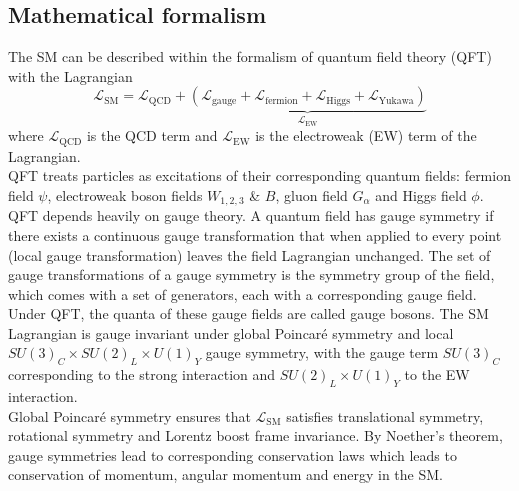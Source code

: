 \documentclass[../thesis.tex]{subfiles}
\begin{document}
\subsection{Mathematical formalism}
The \acs{SM} can be described within the formalism of quantum field theory (\acs{QFT}) with the Lagrangian
\begin{equation}
\mathcal{L}_\mathrm{SM} = \mathcal{L}_\mathrm{QCD} + {\underbrace{(\mathcal{L}_\mathrm{gauge}+\mathcal{L}_\mathrm{fermion}+\mathcal{L}_\mathrm{Higgs}+\mathcal{L}_\mathrm{Yukawa})}_{\mathcal{L}_\mathrm{EW}}}
\end{equation}
where $\mathcal{L}_\mathrm{QCD}$ is the \acs{QCD} term and $\mathcal{L}_\mathrm{EW}$ is the electroweak (\acs{EW}) term of the Lagrangian.\\
QFT treats particles as excitations of their corresponding quantum fields: fermion field $\psi$, electroweak boson fields $W_{1,2,3}$ \& $B$, gluon field $G_\alpha$ and Higgs field $\phi$.\\
\acs{QFT} depends heavily on gauge theory. A quantum field has gauge symmetry if there exists a continuous gauge transformation that when applied to every point (local gauge transformation) leaves the field Lagrangian unchanged. The set of gauge transformations of a gauge symmetry is the symmetry group of the field, which comes with a set of generators, each with a corresponding gauge field. Under \acs{QFT}, the quanta of these gauge fields are called gauge bosons.
The \acs{SM} Lagrangian is gauge invariant under global Poincar\'e symmetry and local $SU(3)_C \times SU(2)_L \times U(1)_Y$ gauge symmetry, with the gauge term $SU(3)_C$ corresponding to the strong interaction and $SU(2)_L \times U(1)_Y$ to the \acs{EW} interaction.\\
Global Poincar\'e symmetry ensures that $\mathcal{L}_\mathrm{SM}$ satisfies translational symmetry, rotational symmetry and Lorentz boost frame invariance. By Noether's theorem, gauge symmetries lead to corresponding conservation laws which leads to conservation of momentum, angular momentum and energy in the \acs{SM}.
\end{document}
